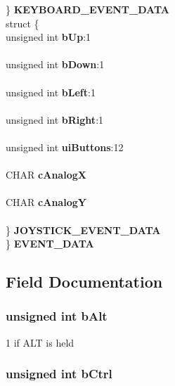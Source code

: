 \begin{DoxyCompactItemize}
\begin{tabbing}
\>\} {\bf KEYBOARD\_EVENT\_DATA}\\
\>struct \{\\
\>\>unsigned int {\bf bUp}:1\\
\>\>\\
\>\>unsigned int {\bf bDown}:1\\
\>\>\\
\>\>unsigned int {\bf bLeft}:1\\
\>\>\\
\>\>unsigned int {\bf bRight}:1\\
\>\>\\
\>\>unsigned int {\bf uiButtons}:12\\
\>\>\\
\>\>CHAR {\bf cAnalogX}\\
\>\>\\
\>\>CHAR {\bf cAnalogY}\\
\>\>\\
\>\} {\bf JOYSTICK\_EVENT\_DATA}\\
\} {\bf EVENT\_DATA}\\

\end{tabbing}\end{DoxyCompactItemize}


\subsection{Field Documentation}
\subsubsection[{bAlt}]{\setlength{\rightskip}{0pt plus 5cm}unsigned int {\bf bAlt}}\label{struct_f_o_o_e_y___e_v_e_n_t___s_t_r_u_c_t_a24109e84817a6dc0967b80c83ea34851}


1 if ALT is held 
\subsubsection[{bCtrl}]{\setlength{\rightskip}{0pt plus 5cm}unsigned int {\bf bCtrl}}\label{struct_f_o_o_e_y___e_v_e_n_t___s_t_r_u_c_t_a34866fde4e39bccf0411f6d914ae43b5}


